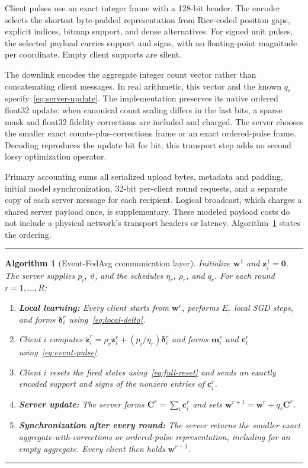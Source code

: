 \documentclass[conference]{IEEEtran}
\newcommand{\vect}[1]{\boldsymbol{#1}}
\newcommand{\coreColor}{\color{coreblue}}
\newcommand{\coreRev}[1]{{\coreColor #1}}
\newtheorem{algorithm}{Algorithm}
\begin{document}
\coreRev{Client pulses use an exact integer frame with a 128-bit header.
The encoder selects the shortest byte-padded representation from Rice-coded
position gaps, explicit indices, bitmap support, and dense alternatives.
For signed unit pulses, the selected payload carries support and signs, with
no floating-point magnitude per coordinate. Empty client supports are silent.}

\coreRev{The downlink encodes the aggregate integer count vector rather than
concatenating client messages. In real arithmetic, this vector and the known
$q_r$ specify~\eqref{eq:server-update}. The implementation preserves its native
ordered float32 update: when canonical count scaling differs in the last bits,
a sparse mask and float32 fidelity corrections are included and charged.
The server chooses the smaller exact counts-plus-corrections frame or an exact
ordered-pulse frame. Decoding reproduces the update bit for bit; this transport
step adds no second lossy optimization operator.}

\coreRev{Primary accounting sums all serialized upload bytes, metadata and
padding, initial model synchronization, 32-bit per-client round requests, and
a separate copy of each server message for each recipient. Logical broadcast,
which charges a shared server payload once, is supplementary. These modeled
payload costs do not include a physical network's transport headers or latency.
Algorithm~\ref{alg:event-fedavg} states the ordering.}

\begin{samepage}
\noindent\rule{\columnwidth}{0.8pt}
\begin{algorithm}[Event-FedAvg communication layer]
\label{alg:event-fedavg}
\normalfont\small
Initialize $\vect{w}^1$ and $\vect{z}_i^1=\vect{0}$. The server supplies
$p_i$, $\vartheta$, and the schedules $\eta_r$, $\rho_r$, and $q_r$. For each
round $r=1,\ldots,R$:
\begin{enumerate}
  \item \textbf{Local learning:} Every client starts from $\vect{w}^r$,
  performs $E_r$ local SGD steps, and forms $\vect{\delta}_i^r$
  using~\eqref{eq:local-delta}.
  \item Client $i$ computes
  $\widetilde{\vect{z}}_i^r=\rho_r\vect{z}_i^r+
  (p_i/\eta_r)\vect{\delta}_i^r$ and forms $\vect{m}_i^r$ and
  $\vect{c}_i^r$ using~\eqref{eq:event-pulse}.
  \item Client $i$ resets the fired states using~\eqref{eq:full-reset} and
  \coreRev{sends an exactly encoded support and signs of the nonzero entries
  of $\vect{c}_i^r$.}
  \item \textbf{Server update:} The server forms
  $\vect{C}^r=\sum_i\vect{c}_i^r$ and sets
  $\vect{w}^{r+1}=\vect{w}^r+q_r\vect{C}^r$.
  \item \textbf{Synchronization after every round:} \coreRev{The server returns the smaller exact aggregate-with-corrections
  or ordered-pulse representation, including for an empty aggregate.
  Every client then holds $\vect{w}^{r+1}$.}
\end{enumerate}
\end{algorithm}
\vspace{-2pt}
\noindent\rule{\columnwidth}{0.8pt}
\end{samepage}
\end{document}
